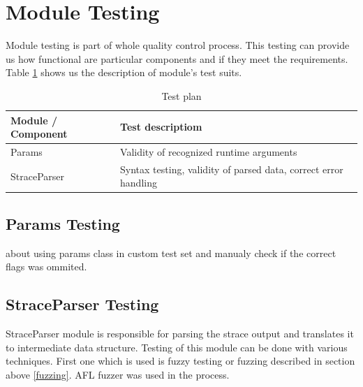 \section{Module Testing}
Module testing is part of whole quality control process.
This testing can provide us how functional are particular components and if they meet the requirements.
Table \ref{table:moduletesting} shows us the description of module's test suits.

\begin{table}[h]
	\centering
	\begin{tabular}{|l|p{10cm}|}
		\hline
		\textbf{Module / Component}	&	\textbf{Test descriptiom} \\ \hline \hline
		Params 											& Validity of recognized runtime arguments \\ \hline
		StraceParser								& Syntax testing, validity of parsed data, correct error handling \\ \hline
	\end{tabular}
	\caption{Test plan}
	\label{table:moduletesting}
\end{table}

\subsection{Params Testing}
about using params class in custom test set and manualy check if the correct flags was ommited.

\subsection{StraceParser Testing}
StraceParser module is responsible for parsing the strace output and translates it to intermediate data structure.
Testing of this module can be done with various techniques.
First one which is used is fuzzy testing or fuzzing described in section above \ref{fuzzing}.
AFL fuzzer was used in the process.
